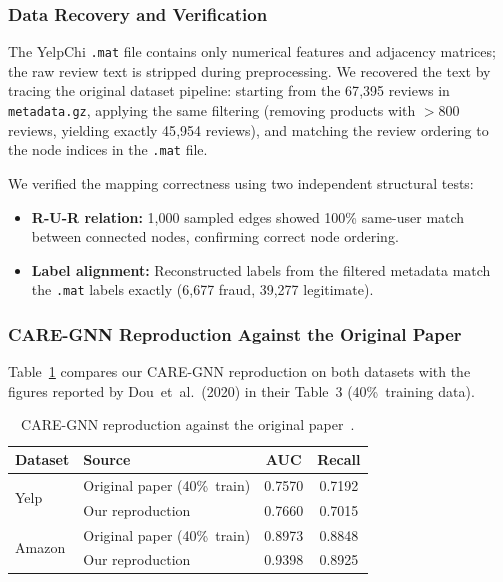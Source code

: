 \subsubsection{Data Recovery and Verification}

The YelpChi \texttt{.mat} file contains only numerical features and adjacency matrices; the raw review text is stripped during preprocessing. We recovered the text by tracing the original dataset pipeline: starting from the 67{,}395 reviews in \texttt{metadata.gz}, applying the same filtering (removing products with $>800$ reviews, yielding exactly 45{,}954 reviews), and matching the review ordering to the node indices in the \texttt{.mat} file.

We verified the mapping correctness using two independent structural tests:
\begin{itemize}
    \item \textbf{R-U-R relation:} 1{,}000 sampled edges showed 100\% same-user match between connected nodes, confirming correct node ordering.
    \item \textbf{Label alignment:} Reconstructed labels from the filtered metadata match the \texttt{.mat} labels exactly (6{,}677 fraud, 39{,}277 legitimate).
\end{itemize}

\subsubsection{CARE-GNN Reproduction Against the Original Paper}

Table~\ref{tab:paper-comparison} compares our CARE-GNN reproduction on both datasets with the figures reported by Dou~et~al.~(2020) in their Table~3 (40\%~training data).

\begin{table}[h!]
\centering
\begin{tabular}{llcc}
\toprule
\textbf{Dataset} & \textbf{Source} & \textbf{AUC} & \textbf{Recall} \\
\midrule
\multirow{2}{*}{Yelp}   & Original paper (40\%~train) & 0.7570 & 0.7192 \\
                        & Our reproduction            & 0.7660 & 0.7015 \\
\midrule
\multirow{2}{*}{Amazon} & Original paper (40\%~train) & 0.8973 & 0.8848 \\
                        & Our reproduction            & 0.9398 & 0.8925 \\
\bottomrule
\end{tabular}
\caption{CARE-GNN reproduction against the original paper~\cite{dou2020enhancing}.}
\label{tab:paper-comparison}
\end{table}

